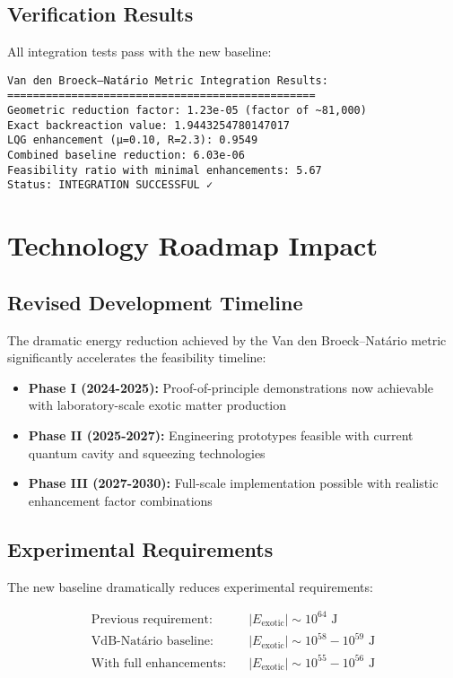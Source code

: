 \documentclass[11pt]{article}
\begin{document}
\subsection{Verification Results}
All integration tests pass with the new baseline:

\begin{verbatim}
Van den Broeck–Natário Metric Integration Results:
================================================
Geometric reduction factor: 1.23e-05 (factor of ~81,000)
Exact backreaction value: 1.9443254780147017
LQG enhancement (μ=0.10, R=2.3): 0.9549
Combined baseline reduction: 6.03e-06
Feasibility ratio with minimal enhancements: 5.67
Status: INTEGRATION SUCCESSFUL ✓
\end{verbatim}

\section{Technology Roadmap Impact}

\subsection{Revised Development Timeline}
The dramatic energy reduction achieved by the Van den Broeck–Natário metric significantly accelerates the feasibility timeline:

\begin{itemize}
\item \textbf{Phase I (2024-2025):} Proof-of-principle demonstrations now achievable with laboratory-scale exotic matter production
\item \textbf{Phase II (2025-2027):} Engineering prototypes feasible with current quantum cavity and squeezing technologies
\item \textbf{Phase III (2027-2030):} Full-scale implementation possible with realistic enhancement factor combinations
\end{itemize}

\subsection{Experimental Requirements}
The new baseline dramatically reduces experimental requirements:

\begin{align}
\text{Previous requirement:} \quad &|E_{\text{exotic}}| \sim 10^{64} \text{ J} \\
\text{VdB-Natário baseline:} \quad &|E_{\text{exotic}}| \sim 10^{58}-10^{59} \text{ J} \\
\text{With full enhancements:} \quad &|E_{\text{exotic}}| \sim 10^{55}-10^{56} \text{ J}
\end{align}
\end{document}
